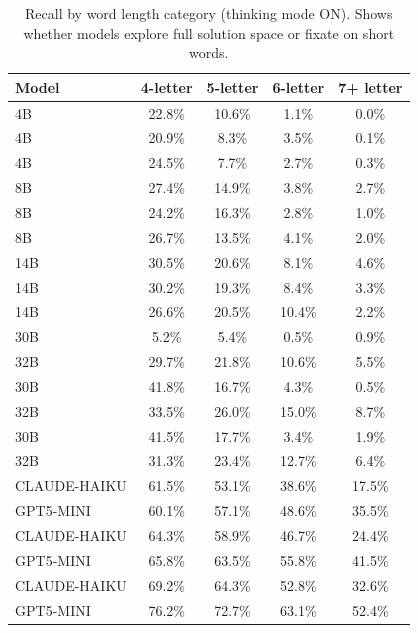 \begin{table}[t]
\centering
\small
\caption{Recall by word length category (thinking mode ON). Shows whether models explore full solution space or fixate on short words.}
\label{tab:length_coverage}
\begin{tabular}{lcccc}
\toprule
\textbf{Model} & \textbf{4-letter} & \textbf{5-letter} & \textbf{6-letter} & \textbf{7+ letter} \\
\midrule
4B  & 22.8\% & 10.6\% & 1.1\% & 0.0\% \\
4B  & 20.9\% & 8.3\% & 3.5\% & 0.1\% \\
4B  & 24.5\% & 7.7\% & 2.7\% & 0.3\% \\
8B  & 27.4\% & 14.9\% & 3.8\% & 2.7\% \\
8B  & 24.2\% & 16.3\% & 2.8\% & 1.0\% \\
8B  & 26.7\% & 13.5\% & 4.1\% & 2.0\% \\
14B & 30.5\% & 20.6\% & 8.1\% & 4.6\% \\
14B & 30.2\% & 19.3\% & 8.4\% & 3.3\% \\
14B & 26.6\% & 20.5\% & 10.4\% & 2.2\% \\
30B & 5.2\% & 5.4\% & 0.5\% & 0.9\% \\
32B & 29.7\% & 21.8\% & 10.6\% & 5.5\% \\
30B & 41.8\% & 16.7\% & 4.3\% & 0.5\% \\
32B & 33.5\% & 26.0\% & 15.0\% & 8.7\% \\
30B & 41.5\% & 17.7\% & 3.4\% & 1.9\% \\
32B & 31.3\% & 23.4\% & 12.7\% & 6.4\% \\
CLAUDE-HAIKU & 61.5\% & 53.1\% & 38.6\% & 17.5\% \\
GPT5-MINI & 60.1\% & 57.1\% & 48.6\% & 35.5\% \\
CLAUDE-HAIKU & 64.3\% & 58.9\% & 46.7\% & 24.4\% \\
GPT5-MINI & 65.8\% & 63.5\% & 55.8\% & 41.5\% \\
CLAUDE-HAIKU & 69.2\% & 64.3\% & 52.8\% & 32.6\% \\
GPT5-MINI & 76.2\% & 72.7\% & 63.1\% & 52.4\% \\
\bottomrule
\end{tabular}
\end{table}




